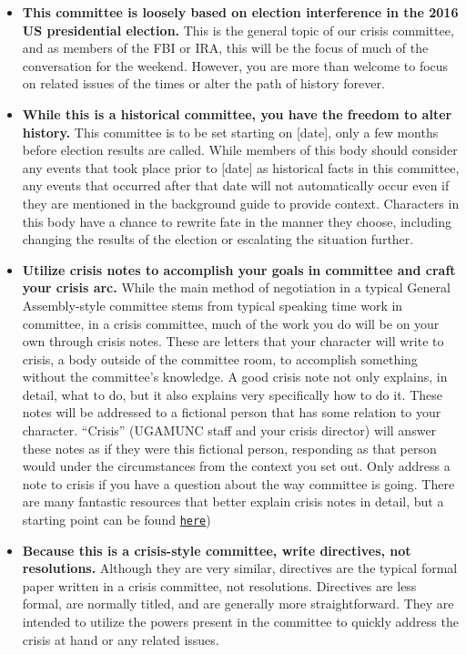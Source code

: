 \documentclass[10pt, letterpaper]{article}
\begin{document}
\begin{itemize}
\item
  \textbf{This committee is loosely based on election interference in
  the 2016 US presidential election.} This is the general topic of our
  crisis committee, and as members of the FBI or IRA, this will be the
  focus of much of the conversation for the weekend. However, you are
  more than welcome to focus on related issues of the times or alter the
  path of history forever.

\item
  \textbf{While this is a historical committee, you have the freedom to
  alter history.} This committee is to be set starting on {[}date{]},
  only a few months before election results are called. While members of
  this body should consider any events that took place prior to
  {[}date{]} as historical facts in this committee, any events that
  occurred after that date will not automatically occur even if they are
  mentioned in the background guide to provide context. Characters in
  this body have a chance to rewrite fate in the manner they choose,
  including changing the results of the election or escalating the
  situation further.

\item
  \textbf{Utilize crisis notes to accomplish your goals in committee and
  craft your crisis arc.} While the main method of negotiation in a
  typical General Assembly-style committee stems from typical speaking
  time work in committee, in a crisis committee, much of the work you do
  will be on your own through crisis notes. These are letters that your
  character will write to crisis, a body outside of the committee room,
  to accomplish something without the committee's knowledge. A good
  crisis note not only explains, in detail, what to do, but it also
  explains very specifically how to do it. These notes will be addressed
  to a fictional person that has some relation to your character.
  ``Crisis'' (UGAMUNC staff and your crisis director) will answer these
  notes as if they were this fictional person, responding as that person
  would under the circumstances from the context you set out. Only
  address a note to crisis if you have a question about the way
  committee is going. There are many fantastic resources that better
  explain crisis notes in detail, but a starting point can be found
  \texttt{\href{http://bestdelegate.com/the-three-crisis-notes-to-send-at-the-beginning-of-any-model-un-crisis-committee/}{here}})

\item
  \textbf{Because this is a crisis-style committee, write directives,
  not resolutions.} Although they are very similar, directives are the
  typical formal paper written in a crisis committee, not resolutions.
  Directives are less formal, are normally titled, and are generally
  more straightforward. They are intended to utilize the powers present
  in the committee to quickly address the crisis at hand or any related
  issues.



\end{itemize}
\end{document}
